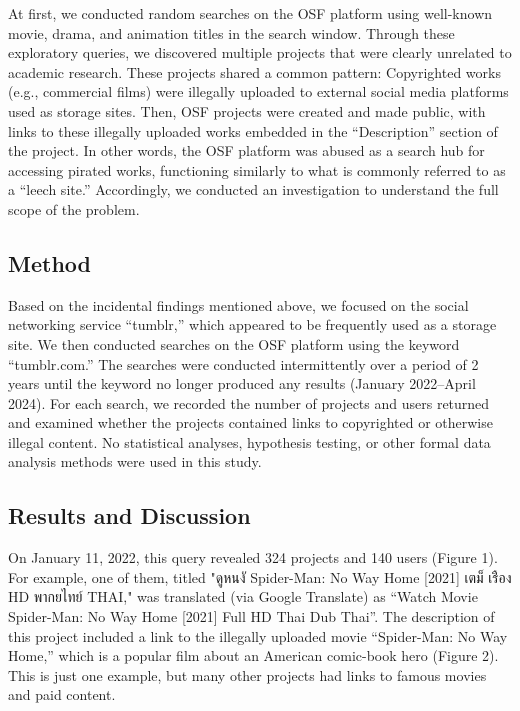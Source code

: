 \documentclass[authordate, meta, issue]{jote-new-article}
\begin{document}
	At first, we conducted random searches on the OSF platform using well-known movie, drama, and animation titles in the search window. Through these exploratory queries, we discovered multiple projects that were clearly unrelated to academic research. These projects shared a common pattern: Copyrighted works (e.g., commercial films) were illegally uploaded to external social media platforms used as storage sites. Then, OSF projects were created and made public, with links to these illegally uploaded works embedded in the “Description” section of the project. In other words, the OSF platform was abused as a search hub for accessing pirated works, functioning similarly to what is commonly referred to as a “leech site.” Accordingly, we conducted an investigation to understand the full scope of the problem.







	\subsection{Method }



	Based on the incidental findings mentioned above, we focused on the social networking service “tumblr,” which appeared to be frequently used as a storage site. We then conducted searches on the OSF platform using the keyword “tumblr.com.” The searches were conducted intermittently over a period of 2 years until the keyword no longer produced any results (January 2022--April 2024). For each search, we recorded the number of projects and users returned and examined whether the projects contained links to copyrighted or otherwise illegal content. No statistical analyses, hypothesis testing, or other formal data analysis methods were used in this study.







	\subsection{Results and Discussion }



	On January 11, 2022, this query revealed 324 projects and 140 users (Figure 1). For example, one of them, titled {\thaifont "ดูหนงั \triangleright Spider-Man: No Way Home [2021] เตม็ เร่ือง HD พากยไทย์ THAI,"} was translated (via Google Translate) as {\thaifont“Watch Movie \triangleright Spider-Man: No Way Home [2021] Full HD Thai Dub Thai”}. The description of this project included a link to the illegally uploaded movie “Spider-Man: No Way Home,” which is a popular film about an American comic-book hero (Figure 2). This is just one example, but many other projects had links to famous movies and paid content.
\end{document}
